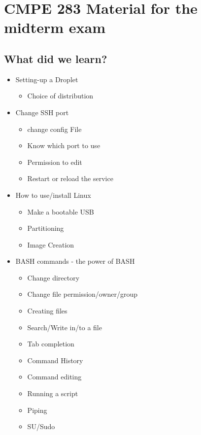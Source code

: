 \documentclass[12pt, a4paper]{article}
\begin{document}

\section*{CMPE 283 Material for the midterm exam}

\subsection*{What did we learn?}

\begin{itemize}
 \item Setting-up a Droplet
 \begin{itemize}
  \item Choice of distribution
 \end{itemize}

 
 \item Change SSH port
 \begin{itemize}
  \item change config File
  \item Know which port to use
  \item Permission to edit
  \item Restart or reload the service
  
 \end{itemize}

 \item How to use/install Linux
\begin{itemize}
  \item Make a bootable USB
  \item Partitioning
  \item Image Creation
 \end{itemize}
 
 \item BASH commands - the power of BASH
 \begin{itemize}
  \item Change directory
  \item Change file permission/owner/group
  \item Creating files
  \item Search/Write in/to a file
  \item Tab completion
  \item Command History
  \item Command editing
  \item Running a script
  \item Piping
  \item SU/Sudo
  

\end{itemize}
\end{itemize}
\end{document}
